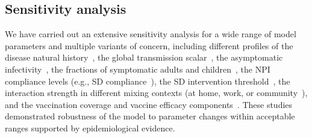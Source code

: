 \documentclass{article}
\begin{document}
\begin{appendices}
\subsection{Sensitivity analysis}
We have carried out an extensive sensitivity analysis for a wide range of model parameters and multiple variants of concern, including  different profiles of the disease natural history~\cite{chang_modelling_2020,chang_simulating_2022,nguyen_general_2022}, the global transmission scalar~\cite{chang_modelling_2020,chang_persistence_2023,nguyen_general_2022}, the asymptomatic infectivity~\cite{chang_modelling_2020,nguyen_general_2022,chang_persistence_2023}, the fractions of symptomatic adults and children~\cite{chang_modelling_2020,chang_simulating_2022,nguyen_general_2022,chang_persistence_2023},  the NPI compliance levels (e.g., SD compliance~\cite{chang_modelling_2020,chang_simulating_2022,chang_persistence_2023}), the SD intervention threshold~\cite{nguyen_general_2022},  the interaction strength in different mixing contexts (at home, work, or community~\cite{chang_modelling_2020}), and the vaccination coverage and vaccine efficacy components~\cite{zachreson_how_2021,chang_modelling_2020}.
These studies demonstrated robustness of the  model to parameter changes within acceptable ranges supported by epidemiological evidence.

\clearpage

\end{appendices}
\end{document}
